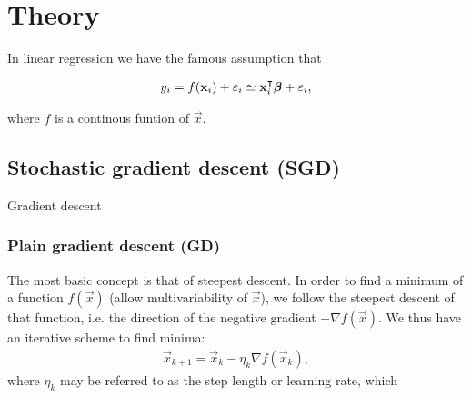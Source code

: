 \section{Theory}\label{sec:theory}

In linear regression we have the famous assumption that 

\begin{align}
    y_i = f(\mathbf{x}_i) + \varepsilon_i \simeq \mathbf{x}_i^\intercal \boldsymbol{\beta} + \varepsilon_i,
\end{align}

where $f$ is a continous funtion of $\vec{x}$.  


\subsection{Stochastic gradient descent (SGD)}\label{sec:stochastic_gradient_descent}
    Gradient descent \citep{mhjensen} 

    \subsubsection{Plain gradient descent (GD)}\label{sec:plain_gradient_descent}
        The most basic concept is that of steepest descent. In order to find a minimum of a function $f(\vec{x})$ (allow multivariability of $\vec{x}$), we follow the steepest descent of that function, i.e. the direction of the negative gradient $-\nabla f(\vec{x})$. We thus have an iterative scheme to find minima:
        \begin{align}\label{eq:steepest_descent}
            \vec{x}_{k+1} = \vec{x}_k - \eta_k\nabla f(\vec{x}_k),
        \end{align}
        where $\eta_k$ may be referred to as the step length or learning rate, which \fillertext

